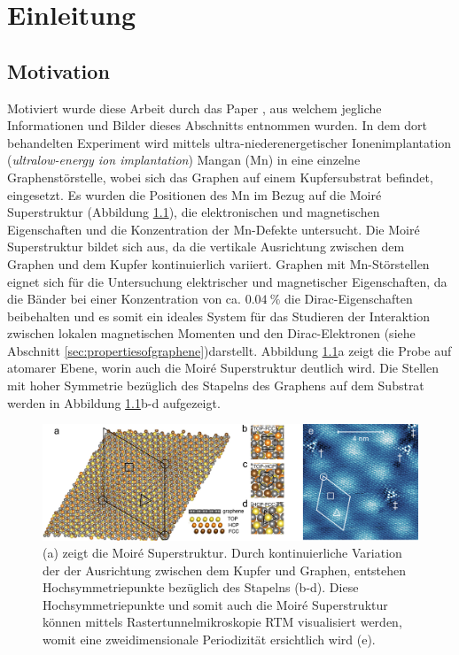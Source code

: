 \chapter{Einleitung}
\section{Motivation}
Motiviert wurde diese Arbeit durch das Paper \cite{doi:10.1021/acsnano.1c00139}, aus welchem jegliche Informationen und Bilder dieses 
Abschnitts entnommen wurden.
In dem dort behandelten Experiment wird mittels ultra-niederenergetischer Ionenimplantation
(\textit{ultralow-energy ion implantation}) Mangan (Mn) in eine einzelne Graphenstörstelle, wobei sich das Graphen auf einem Kupfersubstrat befindet, eingesetzt.
Es wurden die Positionen des Mn im Bezug auf die Moiré Superstruktur (Abbildung \ref{fig:ascnano_structure}), die elektronischen und magnetischen Eigenschaften und die Konzentration der Mn-Defekte
untersucht.
Die Moiré Superstruktur bildet sich aus, da die vertikale Ausrichtung zwischen dem Graphen und dem Kupfer kontinuierlich variiert.
Graphen mit Mn-Störstellen eignet sich für die Untersuchung elektrischer und magnetischer Eigenschaften, da die Bänder bei einer Konzentration von ca. $\qty{0.04}{\percent}$ 
die Dirac-Eigenschaften beibehalten und es somit ein ideales System für das Studieren der Interaktion
zwischen lokalen magnetischen Momenten und den Dirac-Elektronen (siehe Abschnitt \ref{sec:propertiesofgraphene})darstellt.
Abbildung \ref{fig:ascnano_structure}a zeigt die Probe auf atomarer Ebene, worin auch die Moiré Superstruktur deutlich wird.
Die Stellen mit hoher Symmetrie bezüglich des Stapelns des Graphens auf dem Substrat werden in 
Abbildung \ref{fig:ascnano_structure}b-d aufgezeigt.
\begin{figure}
    \centering
    \includegraphics[width = \textwidth]{Plots/images_large_nn1c00139_0002.jpeg}
    \caption{(a) zeigt die Moiré Superstruktur. Durch kontinuierliche Variation der der Ausrichtung 
    zwischen dem Kupfer und Graphen, entstehen Hochsymmetriepunkte bezüglich des Stapelns (b-d).
    Diese Hochsymmetriepunkte und somit auch die Moiré Superstruktur können mittels Rastertunnelmikroskopie RTM 
    visualisiert werden, womit eine zweidimensionale Periodizität ersichtlich wird (e).}
    \label{fig:ascnano_structure}
\end{figure}
